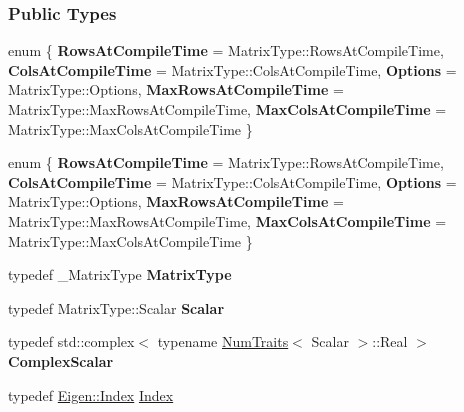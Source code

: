 \subsubsection*{Public Types}
\begin{DoxyCompactItemize}
\item 
\mbox{\label{group___eigenvalues___module_a069519e22a13bf8c3a7d1ab92f2da955}} 
enum \{ \newline
{\bfseries Rows\+At\+Compile\+Time} = Matrix\+Type\+:\+:Rows\+At\+Compile\+Time, 
{\bfseries Cols\+At\+Compile\+Time} = Matrix\+Type\+:\+:Cols\+At\+Compile\+Time, 
{\bfseries Options} = Matrix\+Type\+:\+:Options, 
{\bfseries Max\+Rows\+At\+Compile\+Time} = Matrix\+Type\+:\+:Max\+Rows\+At\+Compile\+Time, 
\newline
{\bfseries Max\+Cols\+At\+Compile\+Time} = Matrix\+Type\+:\+:Max\+Cols\+At\+Compile\+Time
 \}
\item 
\mbox{\label{group___eigenvalues___module_acb8e68b2d44f6f1f97b9556ee5a89764}} 
enum \{ \newline
{\bfseries Rows\+At\+Compile\+Time} = Matrix\+Type\+:\+:Rows\+At\+Compile\+Time, 
{\bfseries Cols\+At\+Compile\+Time} = Matrix\+Type\+:\+:Cols\+At\+Compile\+Time, 
{\bfseries Options} = Matrix\+Type\+:\+:Options, 
{\bfseries Max\+Rows\+At\+Compile\+Time} = Matrix\+Type\+:\+:Max\+Rows\+At\+Compile\+Time, 
\newline
{\bfseries Max\+Cols\+At\+Compile\+Time} = Matrix\+Type\+:\+:Max\+Cols\+At\+Compile\+Time
 \}
\item 
\mbox{\label{group___eigenvalues___module_a78d0d6fe0e8a689523cf2da3f35abe1d}} 
typedef \+\_\+\+Matrix\+Type {\bfseries Matrix\+Type}
\item 
\mbox{\label{group___eigenvalues___module_a06ae61ee5b81d0539fae804f91cd7acb}} 
typedef Matrix\+Type\+::\+Scalar {\bfseries Scalar}
\item 
\mbox{\label{group___eigenvalues___module_a2788cf1defe2e6a0116f43efba689373}} 
typedef std\+::complex$<$ typename \hyperlink{group___core___module_struct_eigen_1_1_num_traits}{Num\+Traits}$<$ Scalar $>$\+::Real $>$ {\bfseries Complex\+Scalar}
\item 
typedef \hyperlink{namespace_eigen_a62e77e0933482dafde8fe197d9a2cfde}{Eigen\+::\+Index} \hyperlink{group___eigenvalues___module_a6201e534e901b5f4e66f72c176b534a3}{Index}

\end{DoxyCompactItemize}
